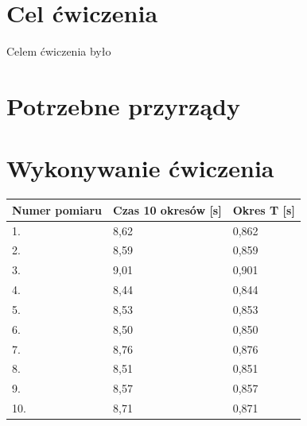 \documentclass[a4paper,11pt]{article}
\begin{document}



\section{Cel ćwiczenia}

Celem ćwiczenia było

\section{Potrzebne przyrządy}


\section{Wykonywanie ćwiczenia}

\begin{table}[h]
\centering
\begin{tabular}{|l|l|l|}
\hline
Numer pomiaru & Czas 10 okresów {[}s{]} & Okres T {[}s{]} \\ \hline
1.            & 8,62                    & 0,862                 \\ \hline
2.            & 8,59                    & 0,859                 \\ \hline
3.            & 9,01                    & 0,901                 \\ \hline
4.            & 8,44                    & 0,844                 \\ \hline
5.            & 8,53                    & 0,853                 \\ \hline
6.            & 8,50                    & 0,850                 \\ \hline
7.            & 8,76                    & 0,876                 \\ \hline
8.            & 8,51                    & 0,851                 \\ \hline
9.            & 8,57                    & 0,857                 \\ \hline
10.           & 8,71                    & 0,871                 \\ \hline
\end{tabular}
\end{table}
\end{document}
